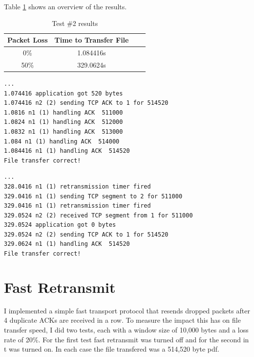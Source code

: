 \documentclass[fleqn,11pt]{article}
\begin{document}
Table \ref{tab:basic_overview_2} shows an overview of the results.

\begin{table}[h]
  \caption{Test \#2 results}
  \label{tab:basic_overview_2}
  \begin{center}
    \begin{tabular}{cccc}
      \toprule
      Packet Loss & Time to Transfer File \\
      \midrule
      0\% & 1.084416s \\
      50\% & 329.0624s \\
      \bottomrule
    \end{tabular}
  \end{center}
\end{table}

\newpage

\begin{lstlisting}[caption={Truncated output for 0\% packet loss}]
...
1.074416 application got 520 bytes
1.074416 n2 (2) sending TCP ACK to 1 for 514520
1.0816 n1 (1) handling ACK  511000
1.0824 n1 (1) handling ACK  512000
1.0832 n1 (1) handling ACK  513000
1.084 n1 (1) handling ACK  514000
1.084416 n1 (1) handling ACK  514520
File transfer correct!
\end{lstlisting}

\begin{lstlisting}[caption={Truncated output for 50\% packet loss}]
...
328.0416 n1 (1) retransmission timer fired
329.0416 n1 (1) sending TCP segment to 2 for 511000
329.0416 n1 (1) retransmission timer fired
329.0524 n2 (2) received TCP segment from 1 for 511000
329.0524 application got 0 bytes
329.0524 n2 (2) sending TCP ACK to 1 for 514520
329.0624 n1 (1) handling ACK  514520
File transfer correct!
\end{lstlisting}

\section{Fast Retransmit}

\indent\indent I implemented a simple fast transport protocol that resends dropped packets
after 4 duplicate ACKs are received in a row. To measure the impact this has on
file transfer speed, I did two tests, each with a window size of 10,000 bytes
and a loss rate of 20\%. For the first test fast retransmit was turned off and
for the second in t was turned on. In each case the file transfered was a
514,520 byte pdf.\\
\end{document}
